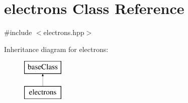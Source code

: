 \hypertarget{classelectrons}{\section{electrons Class Reference}
\label{classelectrons}
}


{\ttfamily \#include $<$electrons.\-hpp$>$}

Inheritance diagram for electrons\-:\begin{figure}[H]
\begin{center}
\leavevmode
\includegraphics[height=2.000000cm]{classelectrons}
\end{center}
\end{figure}


